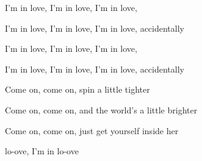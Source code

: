\begin{song}
\bigskip

 I'm in love, I'm in love, I'm in love, \par
I'm in love, I'm in love, I'm in love, accidentally \par
{} I'm in love, I'm in love, I'm in love, \par
I'm in love, I'm in love, I'm in love, accidentally \par

\bigskip

Come on, come on, spin a little tighter \par
{}Come on, come on, and the world's a little brighter \par
{}Come on, come on, just get yourself inside her \par
{}lo-ove, I'm in lo-ove \par

\end{song}
